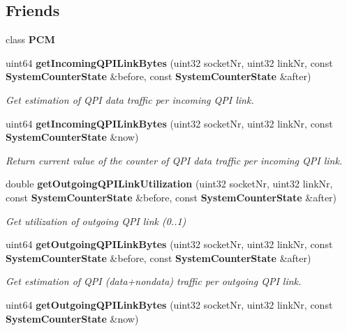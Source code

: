\subsection*{Friends}
\begin{DoxyCompactItemize}
\item 
class {\bfseries P\+C\+M}\label{classSystemCounterState_ab5f56d2e95ba3daf52c17b8a1d356d64}

\item 
uint64 {\bf get\+Incoming\+Q\+P\+I\+Link\+Bytes} (uint32 socket\+Nr, uint32 link\+Nr, const {\bf System\+Counter\+State} \&before, const {\bf System\+Counter\+State} \&after)
\begin{DoxyCompactList}\small\item\em Get estimation of Q\+P\+I data traffic per incoming Q\+P\+I link. \end{DoxyCompactList}\item 
uint64 {\bf get\+Incoming\+Q\+P\+I\+Link\+Bytes} (uint32 socket\+Nr, uint32 link\+Nr, const {\bf System\+Counter\+State} \&now)
\begin{DoxyCompactList}\small\item\em Return current value of the counter of Q\+P\+I data traffic per incoming Q\+P\+I link. \end{DoxyCompactList}\item 
double {\bf get\+Outgoing\+Q\+P\+I\+Link\+Utilization} (uint32 socket\+Nr, uint32 link\+Nr, const {\bf System\+Counter\+State} \&before, const {\bf System\+Counter\+State} \&after)
\begin{DoxyCompactList}\small\item\em Get utilization of outgoing Q\+P\+I link (0..1) \end{DoxyCompactList}\item 
uint64 {\bf get\+Outgoing\+Q\+P\+I\+Link\+Bytes} (uint32 socket\+Nr, uint32 link\+Nr, const {\bf System\+Counter\+State} \&before, const {\bf System\+Counter\+State} \&after)
\begin{DoxyCompactList}\small\item\em Get estimation of Q\+P\+I (data+nondata) traffic per outgoing Q\+P\+I link. \end{DoxyCompactList}\item 
uint64 {\bfseries get\+Outgoing\+Q\+P\+I\+Link\+Bytes} (uint32 socket\+Nr, uint32 link\+Nr, const {\bf System\+Counter\+State} \&now)\label{classSystemCounterState_a336f198b4a81e0d34bb581e8bd8be0e0}

\end{DoxyCompactItemize}
